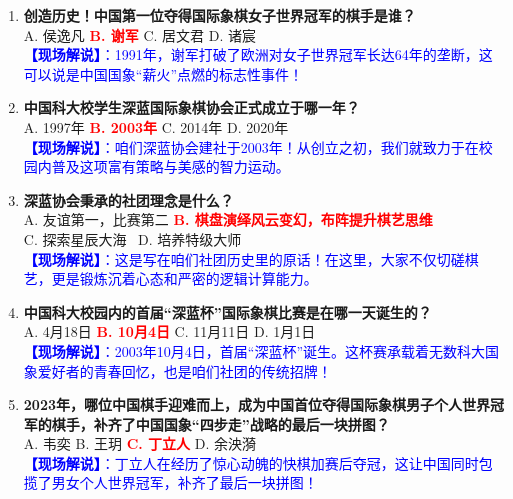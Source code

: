 \documentclass[a4paper, 11pt]{ctexart}
\begin{document}
\begin{enumerate}[label=\arabic*., itemsep=1.5em]

    \item \textbf{创造历史！中国第一位夺得国际象棋女子世界冠军的棋手是谁？} \\
    A. 侯逸凡 \qquad \textcolor{red}{\textbf{B. 谢军}} \qquad C. 居文君 \qquad D. 诸宸 \\
    \textcolor{blue}{\textbf{【现场解说】}：1991年，谢军打破了欧洲对女子世界冠军长达64年的垄断，这可以说是中国国象“薪火”点燃的标志性事件！}

    \item \textbf{中国科大校学生深蓝国际象棋协会正式成立于哪一年？} \\
    A. 1997年 \qquad \textcolor{red}{\textbf{B. 2003年}} \qquad C. 2014年 \qquad D. 2020年 \\
    \textcolor{blue}{\textbf{【现场解说】}：咱们深蓝协会建社于2003年！从创立之初，我们就致力于在校园内普及这项富有策略与美感的智力运动。}

    \item \textbf{深蓝协会秉承的社团理念是什么？} \\
    A. 友谊第一，比赛第二 \qquad \textcolor{red}{\textbf{B. 棋盘演绎风云变幻，布阵提升棋艺思维}} \\
    C. 探索星辰大海 \qquad \qquad \, D. 培养特级大师 \\
    \textcolor{blue}{\textbf{【现场解说】}：这是写在咱们社团历史里的原话！在这里，大家不仅切磋棋艺，更是锻炼沉着心态和严密的逻辑计算能力。}

    \item \textbf{中国科大校园内的首届“深蓝杯”国际象棋比赛是在哪一天诞生的？} \\
    A. 4月18日 \qquad \textcolor{red}{\textbf{B. 10月4日}} \qquad C. 11月11日 \qquad D. 1月1日 \\
    \textcolor{blue}{\textbf{【现场解说】}：2003年10月4日，首届“深蓝杯”诞生。这杯赛承载着无数科大国象爱好者的青春回忆，也是咱们社团的传统招牌！}

    \item \textbf{2023年，哪位中国棋手迎难而上，成为中国首位夺得国际象棋男子个人世界冠军的棋手，补齐了中国国象“四步走”战略的最后一块拼图？} \\
    A. 韦奕 \qquad B. 王玥 \qquad \textcolor{red}{\textbf{C. 丁立人}} \qquad D. 余泱漪 \\
    \textcolor{blue}{\textbf{【现场解说】}：丁立人在经历了惊心动魄的快棋加赛后夺冠，这让中国同时包揽了男女个人世界冠军，补齐了最后一块拼图！}


\end{enumerate}
\end{document}
